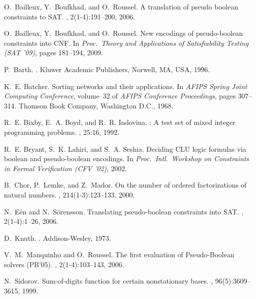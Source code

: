\documentclass[envcountsame]{llncs}
\begin{document}
\newcommand{\noopsort}[1]{}
\begin{thebibliography}{10}

O.\ Bailleux, Y.\ Boufkhad, and O.\ Roussel.
\newblock A translation of pseudo boolean constraints to {SAT}.
, 2(1-4):191--200, 2006.

O.\ Bailleux, Y.\ Boufkhad, and O.\ Roussel.
\newblock New encodings of pseudo-boolean constraints into {CNF}.
\newblock In {\em Proc.\ Theory and Applications of Satisfiability Testing (SAT
  '09)}, pages 181--194, 2009.

P.\ Barth.
.
\newblock Kluwer Academic Publishers, Norwell, MA, USA, 1996.

K.~E. Batcher.
\newblock Sorting networks and their applications.
\newblock In {\em AFIPS Spring Joint Computing Conference}, volume~32 of {\em
  AFIPS Conference Proceedings}, pages 307--314. Thomson Book Company,
  Washington D.C., 1968.

R.~E. Bixby, E.~A. Boyd, and R.~R. Indovina.
: {A} test set of mixed integer programming problems.
, 25:16, 1992.

R.~E. Bryant, S.~K. Lahiri, and S.~A. Seshia.
\newblock Deciding {CLU} logic formulas via boolean and pseudo-boolean
  encodings.
\newblock In {\em Proc.\ Intl.\ Workshop on Constraints in Formal Verification
  (CFV '02)}, 2002.

B.\ Chor, P.\ Lemke, and Z.\ Mador.
\newblock On the number of ordered factorizations of natural numbers.
, 214(1-3):123--133, 2000.



N.\ E\'en and N.\ S\"orensson.
\newblock Translating pseudo-boolean constraints into {SAT}.
, 2(1-4):1--26, 2006.

D.\ Knuth.
.
\newblock Addison-Wesley, 1973.

V.~M.\ Manquinho and O.\ Roussel.
\newblock The first evaluation of {P}seudo-{B}oolean solvers {(PB'05)}.
, 2(1-4):103--143, 2006.

N.~Sidorov.
\newblock Sum-of-digits function for certain nonstationary bases.
, 96(5):3609--3615, 1999.

\end{thebibliography}
\end{document}
